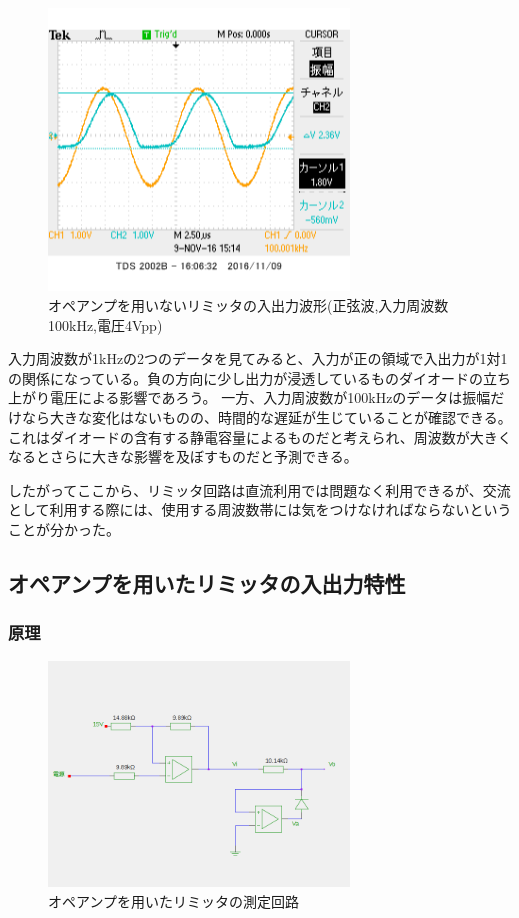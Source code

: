 \documentclass[11pt,a4j]{jsarticle}
\begin{document}
 \begin{figure}[htbp]
  \centering
  \includegraphics[width=8cm,clip]{1_1_noampFG_f100V4_ViVo.png}
  \caption{オペアンプを用いないリミッタの入出力波形(正弦波,入力周波数100kHz,電圧4Vpp)}
  \label{fig:noamp_f100V4}
 \end{figure}%
    
    入力周波数が1kHzの2つのデータを見てみると、入力が正の領域で入出力が1対1の関係になっている。負の方向に少し出力が浸透しているものダイオードの立ち上がり電圧による影響であろう。
    一方、入力周波数が100kHzのデータは振幅だけなら大きな変化はないものの、時間的な遅延が生じていることが確認できる。これはダイオードの含有する静電容量によるものだと考えられ、周波数が大きくなるとさらに大きな影響を及ぼすものだと予測できる。
    
    したがってここから、リミッタ回路は直流利用では問題なく利用できるが、交流として利用する際には、使用する周波数帯には気をつけなければならないということが分かった。
    
    
  \subsection{オペアンプを用いたリミッタの入出力特性}
   \subsubsection{原理}
    
    \begin{figure}[htbp]
  \centering
  \includegraphics[width=8cm,clip]{amp_tokusei.png}
  \caption{オペアンプを用いたリミッタの測定回路}
  \label{fig:amp_tokusei}
 \end{figure}%
    
\end{document}
